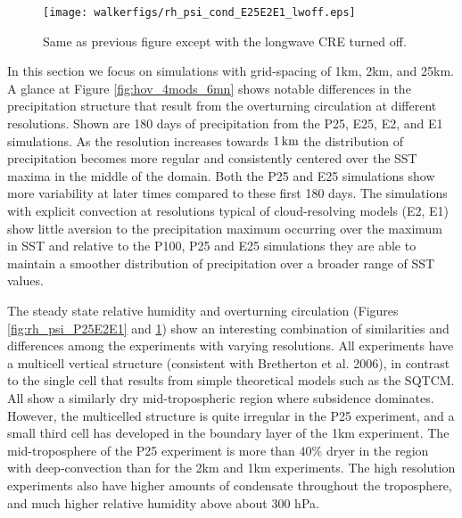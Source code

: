 \documentclass[draft]{agujournal2019}
\begin{document}
\begin{figure}
  \centering
      \texttt{[image: walkerfigs/rh\_psi\_cond\_E25E2E1\_lwoff.eps]}
          \caption{Same as previous figure except with the longwave CRE turned off.}
  \label{fig:rh_psi_P25E2E1_lwoff}
\end{figure}


In this section we focus on simulations with grid-spacing of 1km, 2km, and 25km.   
A glance at Figure \ref{fig:hov_4mods_6mn} shows notable differences in the precipitation structure that result from the 
overturning circulation at different resolutions.  Shown are 180 days of precipitation from the P25, E25, E2, and 
E1 simulations.  As the 
resolution increases towards $1 \, \rm{km}$ the distribution of precipitation becomes more regular and consistently 
centered over the SST maxima in the middle of the domain.  Both the P25 and E25 simulations show more 
variability at later times compared to these first 180 days.  The simulations with explicit convection at resolutions 
typical of cloud-resolving models (E2, E1) show little aversion to the precipitation maximum occurring over 
the maximum in SST and relative to the P100, P25 and E25 simulations 
they are able to maintain a smoother distribution of  precipitation over a broader range of SST values.    


The steady state relative humidity and overturning circulation (Figures \ref{fig:rh_psi_P25E2E1} and 
\ref{fig:rh_psi_P25E2E1_lwoff}) show an interesting combination of similarities and differences
among the experiments with varying resolutions.  All experiments have a multicell vertical structure (consistent with 
Bretherton et al. 2006), in contrast to the single cell that results from simple theoretical models such as the SQTCM.   All 
show a similarly dry mid-tropospheric region where subsidence dominates.  However, the multicelled structure is quite irregular
in the P25 experiment, and a small third cell has developed in the boundary layer of the 1km experiment.  The mid-troposphere 
of the P25 experiment is more than $40\%$ dryer in the region with deep-convection than for the 2km and 1km experiments. 
The high resolution experiments also have higher amounts of condensate throughout the troposphere, and much higher
relative humidity above about 300 hPa. 
\end{document}
